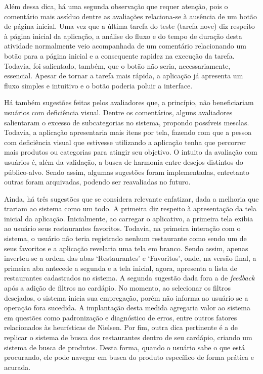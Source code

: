 Além dessa dica, há uma segunda observação que requer atenção, pois o comentário mais assíduo dentre as avaliações relaciona-se à ausência de um botão de página inicial. Uma vez que a última tarefa do teste (tarefa nove) diz respeito à página inicial da aplicação, a análise do fluxo e do tempo de duração desta atividade normalmente veio acompanhada de um comentário relacionando um botão para a página inicial e a consequente rapidez na execução da tarefa. Todavia, foi salientado, também, que o botão não seria, necessariamente, essencial. Apesar de tornar a tarefa mais rápida, a aplicação já apresenta um fluxo simples e intuitivo e o botão poderia poluir a interface.

Há também sugestões feitas pelos avaliadores que, a princípio, não beneficiariam usuários com deficiência visual. Dentre os comentários, alguns avaliadores salientaram o excesso de subcategorias no sistema, propondo possíveis mesclas. Todavia, a aplicação apresentaria mais itens por tela, fazendo com que a pessoa com deficiência visual que estivesse utilizando a aplicação tenha que percorrer mais produtos ou categorias para atingir seu objetivo. O intuito da avaliação com usuários é, além da validação, a busca de harmonia entre desejos distintos do público-alvo. Sendo assim, algumas sugestões foram implementadas, entretanto outras foram arquivadas, podendo ser reavaliadas no futuro.

Ainda, há três sugestões que se considera relevante enfatizar, dada a melhoria que trariam ao sistema como um todo. A primeira diz respeito à apresentação da tela inicial da aplicação. Inicialmente, ao carregar o aplicativo, a primeira tela exibia ao usuário seus restaurantes favoritos. Todavia, na primeira interação com o sistema, o usuário não teria registrado nenhum restaurante como sendo um de seus favoritos e a aplicação revelaria uma tela em branco. Sendo assim, apenas inverteu-se a ordem das abas ‘Restaurantes’ e ‘Favoritos’, onde, na versão final, a primeira aba antecede a segunda e a tela inicial, agora, apresenta a lista de restaurantes cadastrados no sistema. A segunda sugestão dada fora a de \emph{feedback} após a adição de filtros no cardápio. No momento, ao selecionar os filtros desejados, o sistema inicia sua empregação, porém não informa ao usuário se a operação fora sucedida. A implantação desta medida agregaria valor ao sistema em questões como padronização e diagnóstico de erros, entre outros fatores relacionados às heurísticas de Nielsen. Por fim, outra dica pertinente é a de replicar o sistema de busca dos restaurantes dentro de seu cardápio, criando um sistema de busca de produtos. Desta forma, quando o usuário sabe o que está procurando, ele pode navegar em busca do produto específico de forma prática e acurada.